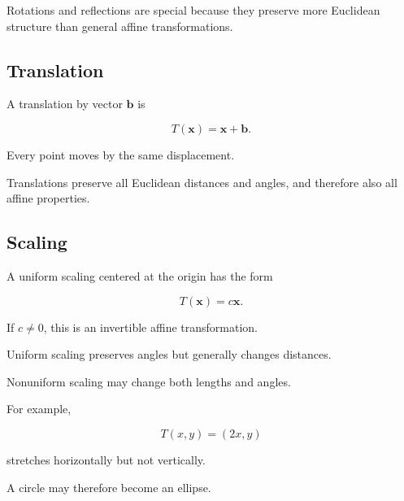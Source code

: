 Rotations and reflections are special because they preserve more Euclidean
structure than general affine transformations.

\subsection{Translation}
\label{subsec:affine-translation}

A translation by vector \(\mathbf{b}\) is

\[ \boxed{T(\mathbf{x})=\mathbf{x}+\mathbf{b}.} \]

Every point moves by the same displacement.

\begin{centereddiagram}
\end{centereddiagram}

Translations preserve all Euclidean distances and angles, and therefore also
all affine properties.

\subsection{Scaling}
\label{subsec:affine-scaling}

A uniform scaling centered at the origin has the form

\[ T(\mathbf{x})=c\mathbf{x}. \]

If \(c\neq0\), this is an invertible affine transformation.

Uniform scaling preserves angles but generally changes distances.

Nonuniform scaling may change both lengths and angles.

For example,

\[
T(x,y)=(2x,y)
\]

stretches horizontally but not vertically.

A circle may therefore become an ellipse.

